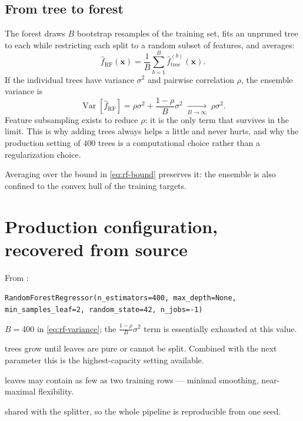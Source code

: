 \subsection{From tree to forest}

The forest draws $B$ bootstrap resamples of the training set, fits an
unpruned tree to each while restricting each split to a random subset of
features, and averages:
\begin{equation}
\hat{f}_{\text{RF}}(\mathbf{x}) = \frac{1}{B} \sum_{b=1}^{B} \hat{f}_{\text{tree}}^{(b)}(\mathbf{x}) .
\end{equation}
If the individual trees have variance $\sigma^2$ and pairwise correlation
$\rho$, the ensemble variance is
\begin{equation}
\operatorname{Var}\!\left[\hat{f}_{\text{RF}}\right]
= \rho \sigma^2 + \frac{1-\rho}{B}\sigma^2
\;\xrightarrow[B \to \infty]{}\; \rho\sigma^2 .
\label{eq:rf-variance}
\end{equation}
Feature subsampling exists to reduce $\rho$: it is the only term that
survives in the limit. This is why adding trees always helps a little and
never hurts, and why the production setting of $400$ trees is a
computational choice rather than a regularization choice.

Averaging over the bound in \cref{eq:rf-bound} preserves it: the ensemble
is also confined to the convex hull of the training targets.

\section{Production configuration, recovered from source}

From :
\begin{center}\small
\texttt{RandomForestRegressor(n\_estimators=400, max\_depth=None,\\
min\_samples\_leaf=2, random\_state=42, n\_jobs=-1)}
\end{center}

\begin{description}[leftmargin=1.5em, style=nextline, font=\bfseries\color{dgreen}]
\item[\texttt{n\_estimators=400}] $B = 400$ in \cref{eq:rf-variance}; the
  $\frac{1-\rho}{B}\sigma^2$ term is essentially exhausted at this value.
\item[\texttt{max\_depth=None}] trees grow until leaves are pure or cannot
  be split. Combined with the next parameter this is the highest-capacity
  setting available.
\item[\texttt{min\_samples\_leaf=2}] leaves may contain as few as two
  training rows --- minimal smoothing, near-maximal flexibility.
\item[\texttt{random\_state=42}] shared with the splitter, so the whole
  pipeline is reproducible from one seed.
\end{description}

